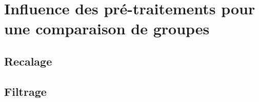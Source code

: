 
\chapter{Influence des pré-traitements pour une comparaison de groupes}
\label{Chapter10}






\section{Recalage}
\section{Filtrage}